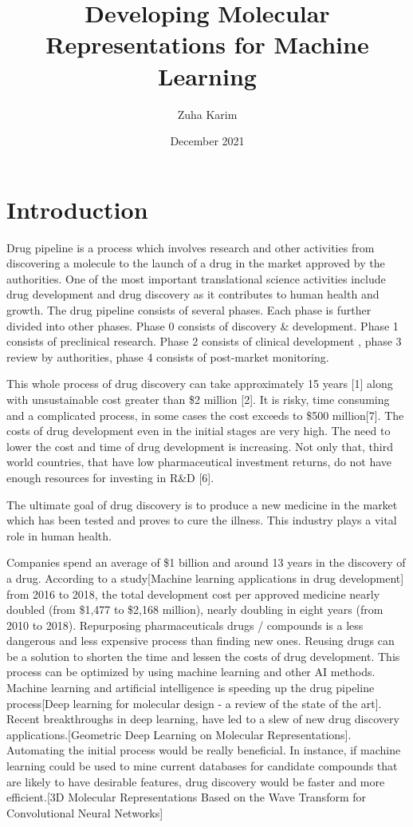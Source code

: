\documentclass[rnd]{mas_proposal}
\title{Developing Molecular Representations for Machine Learning}
\author{Zuha Karim}
\date{December 2021}
\begin{document}
\maketitle

\pagestyle{plain}

\section{Introduction}
    
    Drug pipeline is a process which involves research and other activities from discovering a molecule to the launch of a drug in the market approved by the authorities. One of the most important translational science activities include drug development and drug discovery as it contributes to human health and growth. The drug pipeline consists of several phases. Each phase is further divided into other phases. Phase 0 consists of discovery \& development. Phase 1 consists of preclinical research. Phase 2 consists of clinical development , phase 3 review by authorities, phase 4 consists of post-market monitoring. 
    

    This whole process of drug discovery can take approximately 15 years [1] along with unsustainable cost greater than \$2 million [2]. It is risky, time consuming and a complicated process, in some cases the cost exceeds to \$500 million[7]. The costs of drug development even in the initial stages are very high. The need to lower the cost and time of drug development is increasing. Not only that, third world countries, that have low pharmaceutical investment returns, do not have enough resources for investing in R\&D [6].


    
    The ultimate goal of drug discovery is to produce a new medicine in the market which has been tested and proves to cure the illness. This industry plays a vital role in human health.
    
    Companies spend an average of \$1 billion and around 13 years in the discovery of a drug. According to a study[Machine learning applications in drug development] from 2016 to 2018, the total development cost per approved medicine nearly doubled (from \$1,477 to \$2,168 million), nearly doubling in eight years (from 2010 to 2018). Repurposing pharmaceuticals drugs / compounds is a less dangerous and less expensive process than finding new ones. Reusing drugs can be a solution to shorten the time and lessen the costs of drug development. This process can be optimized by using machine learning and other AI methods. Machine learning and artificial intelligence is speeding up the drug pipeline process[Deep learning for molecular design - a review of the state of the art]. Recent breakthroughs in deep learning, have led to a slew of new drug discovery applications.[Geometric Deep Learning on Molecular Representations]. Automating the initial process would be really beneficial. In instance, if machine learning could be used to mine current databases for candidate compounds that are likely to have desirable features, drug discovery would be faster and more efficient.[3D Molecular Representations Based on the Wave Transform for Convolutional Neural Networks]
    
\end{document}
